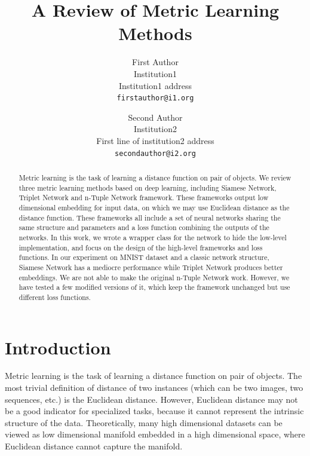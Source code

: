 \documentclass[10pt,twocolumn,letterpaper]{article}
\begin{document}
	
	\title{A Review of Metric Learning Methods}
	
	\author{First Author\\
		Institution1\\
		Institution1 address\\
		{\tt\small firstauthor@i1.org}
		\and
		Second Author\\
		Institution2\\
		First line of institution2 address\\
		{\tt\small secondauthor@i2.org}
	}
	
	\maketitle
	
	\begin{abstract}
		Metric learning is the task of learning a distance function on pair of objects. We review three metric learning methods based on deep learning, including Siamese Network, Triplet Network and n-Tuple Network framework. These frameworks output low dimensional embedding for input data, on which we may use Euclidean distance as the distance function. These frameworks all include a set of neural networks sharing the same structure and parameters and a loss function combining the outputs of the networks. In this work, we wrote a wrapper class for the network to hide the low-level implementation, and focus on the design of the high-level frameworks and loss functions. In our experiment on MNIST dataset and a classic network structure, Siamese Network has a mediocre performance while Triplet Network produces better embeddings. We are not able to make the original n-Tuple Network work. However, we have tested a few modified versions of it, which keep the framework unchanged but use different loss functions.
	\end{abstract}
	
	\section{Introduction}
	Metric learning is the task of learning a distance function on pair of objects. The most trivial definition of distance of two instances (which can be two images, two sequences, etc.) is the Euclidean distance. However, Euclidean distance may not be a good indicator for specialized tasks, because it cannot represent the intrinsic structure of the data. Theoretically, many high dimensional datasets can be viewed as low dimensional manifold embedded in a high dimensional space, where Euclidean distance cannot capture the manifold.
	
\end{document}
